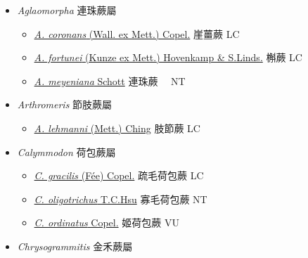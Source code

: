 
  \begin{itemize}
 \item[] \textit{Aglaomorpha} 連珠蕨屬
                    
  \begin{itemize}
        \item[] \href{http://www.theplantlist.org/tpl1.1/search?q=Aglaomorpha+coronans}{\textit{A. coronans} (Wall. ex Mett.) Copel.}     崖薑蕨 LC
        \item[] \href{http://www.theplantlist.org/tpl1.1/search?q=Aglaomorpha+fortunei}{\textit{A. fortunei} (Kunze ex Mett.) Hovenkamp \& S.Linds.}     槲蕨 LC
        \item[] \href{http://www.theplantlist.org/tpl1.1/search?q=Aglaomorpha+meyeniana}{\textit{A. meyeniana} Schott}   連珠蕨　 NT
  \end{itemize}
 \item[] \textit{Arthromeris} 節肢蕨屬
                    
  \begin{itemize}
        \item[] \href{http://www.theplantlist.org/tpl1.1/search?q=Arthromeris+lehmanni}{\textit{A. lehmanni} (Mett.) Ching}   肢節蕨 LC
  \end{itemize}
 \item[] \textit{Calymmodon} 荷包蕨屬
                    
  \begin{itemize}
        \item[] \href{http://www.theplantlist.org/tpl1.1/search?q=Calymmodon+gracilis}{\textit{C. gracilis} (Fée) Copel.}   疏毛荷包蕨 LC
        \item[] \href{http://www.theplantlist.org/tpl1.1/search?q=Calymmodon+oligotrichus}{\textit{C. oligotrichus} T.C.Hsu}   寡毛荷包蕨 NT
        \item[] \href{http://www.theplantlist.org/tpl1.1/search?q=Calymmodon+ordinatus}{\textit{C. ordinatus} Copel.}     姬荷包蕨 VU
  \end{itemize}
 \item[] \textit{Chrysogrammitis} 金禾蕨屬
                    

\end{itemize}

